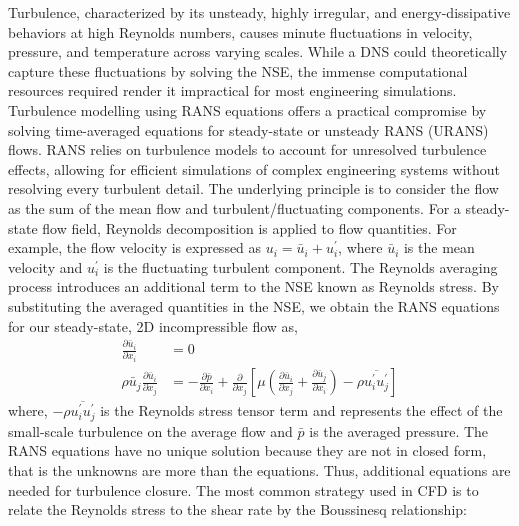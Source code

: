 Turbulence, characterized by its unsteady, highly irregular, and energy-dissipative behaviors at high Reynolds numbers, causes minute fluctuations in velocity, pressure, and temperature across varying scales. While a DNS could theoretically capture these fluctuations by solving the NSE, the immense computational resources required render it impractical for most engineering simulations. 
Turbulence modelling using \gls{RANS} equations offers a practical compromise by solving time-averaged equations for steady-state or unsteady RANS (URANS) flows. RANS relies on turbulence models to account for unresolved turbulence effects, allowing for efficient simulations of complex engineering systems without resolving every turbulent detail. The underlying principle is to consider the flow as the sum of the mean flow and turbulent/fluctuating components. For a steady-state flow field, Reynolds decomposition is applied to flow quantities. For example, the flow velocity is expressed as $u_i = \bar{u}_i + u_i^{\prime}$, where $\bar{u}_i$ is the mean velocity and $u_i^{\prime}$ is the fluctuating turbulent component. The Reynolds averaging process introduces an additional term to the NSE known as Reynolds stress. By substituting the averaged quantities in the NSE, we obtain the RANS equations for our steady-state, 2D incompressible flow as,
\begin{equation}
  \begin{aligned}
  \frac{\partial \bar{u}_i}{\partial x_i}&=0 \\
  \rho \bar{u}_j \frac{\partial \bar{u}_i}{\partial x_j}&= - \frac{\partial \bar{p}}{\partial x_i} + \frac{\partial}{\partial x_j}     \left[ \mu \left(\frac{\partial \bar{u}_i}{\partial x_j}+\frac{\partial \bar{u}_j}{\partial x_i}\right) - \rho \overline{u_i^{\prime} u_j^{\prime}} \right] 
  \end{aligned}
\end{equation}
where, $- \rho \overline{u_i^{\prime} u_j^{\prime}}$ is the Reynolds stress tensor term and represents the effect of the small-scale turbulence on the average flow and $\bar{p}$ is the averaged pressure. The RANS equations have no unique solution because they are not in closed form, that is the unknowns are more than the equations. Thus, additional equations are needed for turbulence closure. The most common strategy used in CFD is to relate the Reynolds stress to the shear rate by the Boussinesq relationship:
